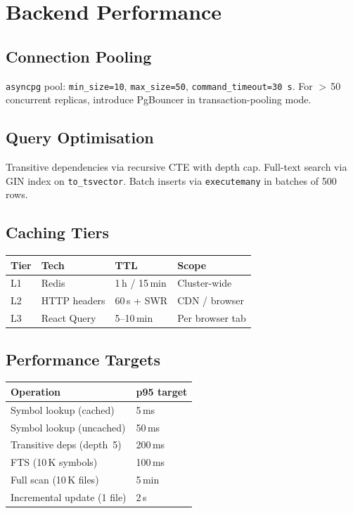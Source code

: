 \chapter{Backend Performance}

\section{Connection Pooling}
\texttt{asyncpg} pool: \texttt{min\_size=10}, \texttt{max\_size=50},
\texttt{command\_timeout=30\,s}.  For $>$\,50 concurrent replicas, introduce
PgBouncer in transaction-pooling mode.

\section{Query Optimisation}
Transitive dependencies via recursive CTE with depth cap.  Full-text
search via GIN index on \texttt{to\_tsvector}.  Batch inserts via
\texttt{executemany} in batches of 500 rows.

\section{Caching Tiers}

\begin{table}[h]
\centering
\begin{tabular}{@{}llll@{}}
\toprule
\textbf{Tier} & \textbf{Tech} & \textbf{TTL} & \textbf{Scope} \\
\midrule
L1 & Redis         & 1\,h / 15\,min & Cluster-wide \\
L2 & HTTP headers  & 60\,s + SWR     & CDN / browser \\
L3 & React Query   & 5--10\,min      & Per browser tab \\
\bottomrule
\end{tabular}
\end{table}

\section{Performance Targets}

\begin{table}[h]
\centering
\begin{tabular}{@{}ll@{}}
\toprule
\textbf{Operation} & \textbf{p95 target} \\
\midrule
Symbol lookup (cached)            & 5\,ms \\
Symbol lookup (uncached)          & 50\,ms \\
Transitive deps (depth~5)        & 200\,ms \\
FTS (10\,K symbols)               & 100\,ms \\
Full scan (10\,K files)           & 5\,min \\
Incremental update (1 file)       & 2\,s \\
\bottomrule
\end{tabular}
\end{table}
